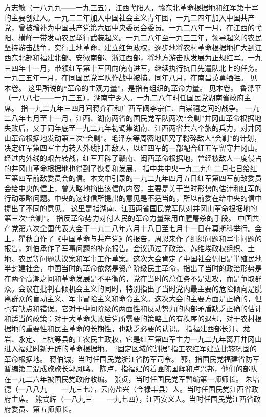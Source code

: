 \begin{maonote}
方志敏（一八九九——一九三五），江西弋阳人，赣东北革命根据地和红军第十军的主要创建人。一九二二年加入中国社会主义青年团，一九二四年加入中国共产党，曾被增补为中国共产党第六届中央委员会委员。一九二八年一月，在江西的弋阳、横峰一带发动农民举行武装起义。一九二八年至一九三三年，领导起义的农民坚持游击战争，实行土地革命，建立红色政权，逐步地将农村革命根据地扩大到江西东北部和福建北部、安徽南部、浙江西部，将地方游击队发展为正规红军。一九三四年十一月，带领红军第十军团向皖南进军，继续执行抗日先遣队北上的任务。一九三五年一月，在同国民党军队作战中被捕。同年八月，在南昌英勇牺牲。
见本卷。
这里所说的“革命的主观力量”，是指有组织的革命力量。
见本卷。
鲁涤平（一八八七——一九三五），湖南宁乡人。一九二八年时任国民党湖南省政府主席。
指一九二九年三四月间蒋介石和广西军阀李宗仁、白崇禧之间的战争。
一九二八年七月至十一月，江西、湖南两省的国民党军队两次“会剿”井冈山革命根据地失败后，又于同年底至一九二九年初调集湖南、江西两省共六个旅的兵力，对井冈山革命根据地发动第三次“会剿”。毛泽东等周密地研究了粉碎敌人“会剿”的计划，决定红军第四军主力转入外线打击敌人，以红四军的一部配合红五军留守井冈山。经过内外线的艰苦转战，红军开辟了赣南、闽西革命根据地，曾经被敌人一度侵占的井冈山革命根据地也得到了恢复和发展。
指中共中央一九二九年二月七日给红军第四军前敌委员会的信。本文中引录的一九二九年四月五日红军第四军前敌委员会给中央的信上，曾大略地摘出该信的内容，主要是关于当时形势的估计和红军的行动策略问题。中央的这封信所提出的意见是不适当的，所以前委在给中央的信中提出了不同的意见。
这里是指湖南、江西两省国民党军队对井冈山革命根据地的第三次“会剿”。
指反革命势力对付人民的革命力量采用血腥屠杀的手段。
中国共产党第六次全国代表大会于一九二八年六月十八日至七月十一日在莫斯科举行。会上，瞿秋白作了《中国革命与共产党》的报告，周恩来作了组织问题和军事问题的报告，刘伯承作了军事问题的补充报告。会议通过了政治、苏维埃政权组织、土地、农民等问题决议案和军事工作草案。这次大会肯定了中国社会仍旧是半殖民地半封建社会，中国当时的革命依然是资产阶级民主革命，指出了当时的政治形势是在两个高潮之间和革命发展是不平衡的，党在当时的总任务不是进攻，而是争取群众。会议在批判右倾机会主义的同时，特别指出了当时党内最主要的危险倾向是脱离群众的盲动主义、军事冒险主义和命令主义。这次大会的主要方面是正确的，但也有缺点和错误。它对于中间阶级的两面性和反动势力的内部矛盾缺乏正确的估计和适当的政策；对于大革命失败后党所需要的策略上的有秩序的退却，对于农村根据地的重要性和民主革命的长期性，也缺乏必要的认识。
指福建西部长汀、龙岩、永定、上杭等县的工农民主政权，它是红军第四军主力一九二九年离开井冈山进入福建时新开辟的革命根据地。
“固定区域的割据”指工农红军建立比较巩固的革命根据地。
蒋伯诚，当时任国民党浙江省防军司令。
郭，指国民党福建省防军暂编第二混成旅旅长郭凤鸣。
陈卢，指福建的着匪陈国辉和卢兴邦，他们的部队在一九二六年被国民党政府收编。
张贞，当时任国民党军暂编第一师师长。
朱培德（一八八九——一九三七），云南盐兴（今禄丰县）人。当时任国民党江西省政府主席。
熊式辉（一八九三——一九七四），江西安义人。当时任国民党江西省政府委员、第五师师长。
\end{maonote}
